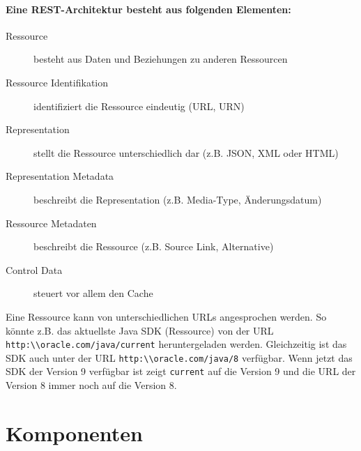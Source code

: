 \paragraph{Eine REST-Architektur besteht aus folgenden Elementen:}
\begin{description}
	\item[Ressource] besteht aus Daten und Beziehungen zu anderen Ressourcen
	\item[Ressource Identifikation] identifiziert die Ressource eindeutig (URL, URN)
	\item[Representation] stellt die Ressource unterschiedlich dar (z.B. JSON, XML oder HTML)
	\item[Representation Metadata] beschreibt die Representation (z.B. Media-Type, Änderungsdatum)
	\item[Ressource Metadaten] beschreibt die Ressource (z.B. Source Link, Alternative)
	\item[Control Data] steuert vor allem den Cache
\end{description}
Eine Ressource kann von unterschiedlichen URLs angesprochen werden. So könnte z.B. das aktuellste Java SDK (Ressource) von der URL \verb|http:\\oracle.com/java/current| heruntergeladen werden. Gleichzeitig ist das SDK auch unter der URL \verb|http:\\oracle.com/java/8| verfügbar. Wenn jetzt das SDK der Version 9 verfügbar ist zeigt \verb|current| auf die Version 9 und die URL der Version 8 immer noch auf die Version 8.

\section{Komponenten}

